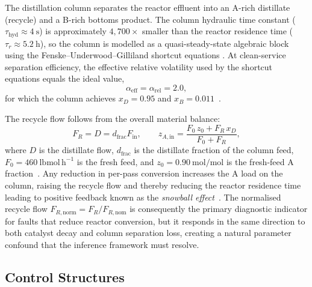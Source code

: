 \documentclass[aps,pre,twocolumn,superscriptaddress,floatfix]{revtex4-2}
\begin{document}
The distillation column separates the reactor effluent into an A-rich distillate (recycle) and a B-rich bottoms product. The column hydraulic time constant ($\tau_\mathrm{hyd} \approx 4~\mathrm{s}$) is approximately $4{,}700\times$ smaller than the reactor residence time ($\tau_r \approx 5.2~\mathrm{h}$), so the column is modelled as a quasi-steady-state algebraic block using the Fenske--Underwood--Gilliland shortcut equations \citep{FUG_1991}.   At clean-service separation efficiency, the effective relative volatility used by the shortcut equations equals the ideal value,
%
\begin{equation}
  \alpha_\mathrm{eff} = \alpha_\mathrm{rel} = 2.0,
  \label{eq:wu_alphaeff}
\end{equation}
%
for which the column achieves $x_D = 0.95$ and $x_B = 0.011$~\citep{Wu2003}.

The recycle flow follows from the overall material balance:
%
\begin{equation}
  F_R = D = d_\mathrm{frac}F_\mathrm{in},
  \qquad
  z_{A,\mathrm{in}} = \frac{F_0\,z_0 + F_R\,x_D}{F_0 + F_R},
  \label{eq:wu_recycle}
\end{equation}
%
where $D$ is the distillate flow, $d_\mathrm{frac}$ is the distillate fraction of the column feed, $F_0 = 460~\mathrm{lbmol\,h^{-1}}$ is the fresh feed, and $z_0 = 0.90~\mathrm{mol/mol}$ is the fresh-feed A fraction~\citep{Wu2003}. Any reduction in per-pass conversion increases the A load on the column, raising the recycle flow and thereby reducing the reactor residence time leading to positive feedback known as the
\emph{snowball effect}~\citep{Luyben1994, Larsson2003}. The normalised recycle flow $F_{R,\mathrm{norm}} = F_R/F_{R,\mathrm{nom}}$ is consequently the primary diagnostic indicator for faults that reduce reactor conversion, but it responds in the same direction to both catalyst decay and column separation loss, creating a natural parameter confound that the inference framework must resolve.


\subsection{Control Structures}
\label{sec:wu_control}
\end{document}

